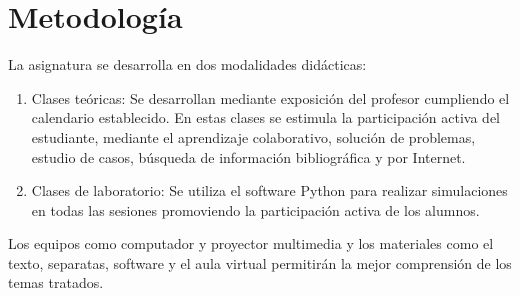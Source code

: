 \section{Metodología}


La asignatura se desarrolla en dos modalidades didácticas:

\begin{enumerate}[label=\arabic*., font=\bfseries, nosep]
  \item

        Clases teóricas: Se desarrollan mediante exposición del profesor
        cumpliendo el calendario establecido.
        En estas clases se estimula la participación activa del
        estudiante, mediante el aprendizaje colaborativo, solución de
        problemas, estudio de casos, búsqueda de información
        bibliográfica y por Internet.

  \item

        Clases de laboratorio: Se utiliza el software Python para
        realizar simulaciones en todas las sesiones promoviendo la
        participación activa de los alumnos.
\end{enumerate}

Los equipos como computador y proyector multimedia y los materiales
como el texto, separatas, software y el aula virtual permitirán la
mejor comprensión de los temas tratados.



